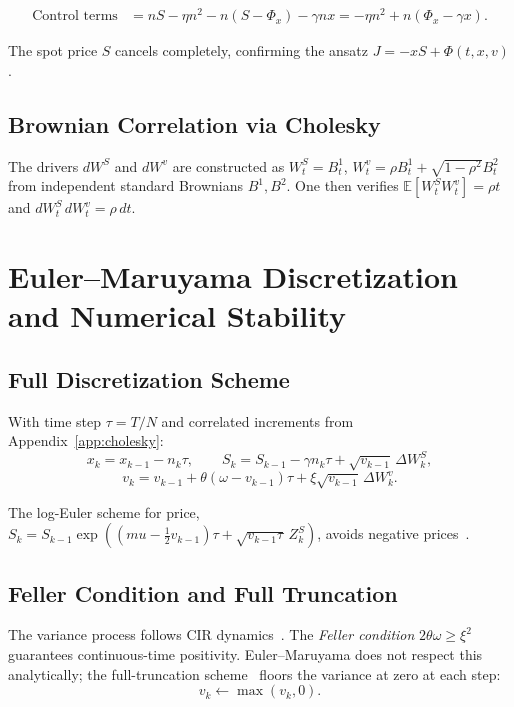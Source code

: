 \documentclass[11pt]{article}
\begin{document}
\begin{align*}
\text{Control terms} &= nS - \eta n^2 - n(S-\Phi_x) - \gamma n x
= -\eta n^2 + n(\Phi_x - \gamma x).
\end{align*}

The spot price $S$ cancels completely, confirming the ansatz $J = -xS + \Phi(t,x,v)$.

\subsection{Brownian Correlation via Cholesky}

The drivers $dW^S$ and $dW^v$ are constructed as
$W^S_t = B^1_t$, $W^v_t = \rho B^1_t + \sqrt{1-\rho^2}B^2_t$
from independent standard Brownians $B^1, B^2$. One then verifies
$\mathbb{E}[W^S_t W^v_t] = \rho t$ and $dW^S_t\,dW^v_t = \rho\,dt$.

\section{Euler--Maruyama Discretization and Numerical Stability}
\label{app:euler}

\subsection{Full Discretization Scheme}

With time step $\tau = T/N$ and correlated increments from Appendix~\ref{app:cholesky}:
\[
x_k = x_{k-1} - n_k\tau, \qquad
S_k = S_{k-1} - \gamma n_k\tau + \sqrt{v_{k-1}}\,\Delta W_k^S,
\]
\[
v_k = v_{k-1} + \theta(\omega - v_{k-1})\tau + \xi\sqrt{v_{k-1}}\,\Delta W_k^v.
\]

The log-Euler scheme for price, $S_k = S_{k-1}\exp\!\left((mu - \frac{1}{2}v_{k-1})\tau + \sqrt{v_{k-1}\tau}\,Z^S_k\right)$,
avoids negative prices~\cite{kloeden1992numerical}.

\subsection{Feller Condition and Full Truncation}

The variance process follows CIR dynamics~\cite{cox1985theory}.
The \emph{Feller condition} $2\theta\omega \geq \xi^2$ guarantees continuous-time
positivity. Euler--Maruyama does not respect this analytically; the full-truncation
scheme~\cite{glasserman2004monte} floors the variance at zero at each step:
\[
v_k \leftarrow \max(v_k, 0).
\]
\end{document}
